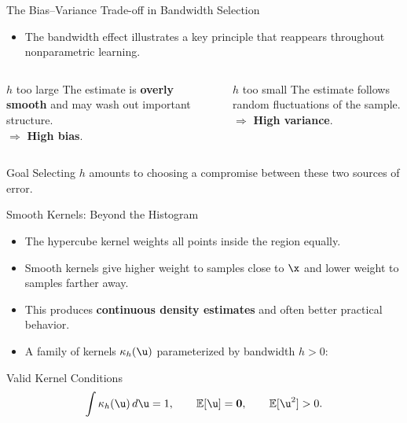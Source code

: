\begin{frame}{The Bias--Variance Trade-off in Bandwidth Selection}
  \begin{itemize}
    \item The bandwidth effect illustrates a \alert{key principle} that reappears throughout nonparametric learning.
  \end{itemize}
  \vspace{0.4em}
  \begin{columns}[t]
      \begin{alertblock}{$h$ too large}
        The estimate is \textbf{overly smooth} and may wash out important structure.\\
        $\Rightarrow$ \textbf{High bias}.
      \end{alertblock}
      \begin{alertblock}{$h$ too small}
        The estimate follows random fluctuations of the sample.\\
        $\Rightarrow$ \textbf{High variance}.
      \end{alertblock}
  \end{columns}
  \vspace{0.5em}
  \begin{block}{Goal}
    Selecting $h$ amounts to choosing a compromise between these two sources of error.
  \end{block}
\end{frame}

\begin{frame}{Smooth Kernels: Beyond the Histogram}
  \begin{itemize}
    \item The hypercube kernel weights all points inside the region equally.
    \item \alert{Smooth kernels} give higher weight to samples close to $\x$ and lower weight to samples farther away.
    \item This produces \textbf{continuous density estimates} and often better practical behavior.
    \item A family of kernels $\kappa_h(\u)$ parameterized by bandwidth $h > 0$:
  \end{itemize}
  \vspace{0.3em}
  \begin{block}{Valid Kernel Conditions}
    \[
      \int \kappa_h(\u)\,d\u = 1, \qquad
      \mathbb{E}[\u] = \mathbf{0}, \qquad
      \mathbb{E}[\u^2] > 0.
    \]
  \end{block}
\end{frame}

